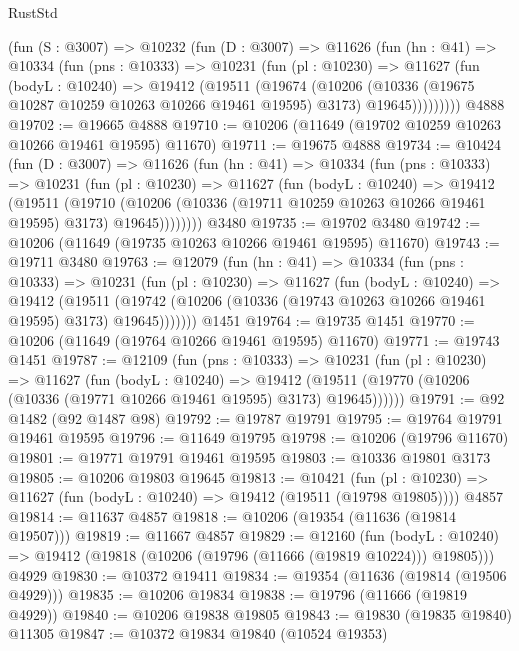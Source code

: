 \begin{lexlean}{RustStd}
\begin{coremodule}
    (fun (S : @3007) =>
    @10232
      (fun (D : @3007) =>
      @11626
        (fun (hn : @41) =>
        @10334
          (fun (pns : @10333) =>
          @10231
            (fun (pl : @10230) =>
            @11627
              (fun (bodyL : @10240) =>
              @19412
                (@19511
                  (@19674
                    (@10206
                      (@10336 (@19675 @10287 @10259 @10263 @10266 @19461 @19595) @3173)
                      @19645)))))))))
    @4888
@19702 := @19665 @4888
@19710 := @10206 (@11649 (@19702 @10259 @10263 @10266 @19461 @19595) @11670)
@19711 := @19675 @4888
@19734 := @10424
    (fun (D : @3007) =>
    @11626
      (fun (hn : @41) =>
      @10334
        (fun (pns : @10333) =>
        @10231
          (fun (pl : @10230) =>
          @11627
            (fun (bodyL : @10240) =>
            @19412
              (@19511
                (@19710
                  (@10206 (@10336 (@19711 @10259 @10263 @10266 @19461 @19595) @3173) @19645))))))))
    @3480
@19735 := @19702 @3480
@19742 := @10206 (@11649 (@19735 @10263 @10266 @19461 @19595) @11670)
@19743 := @19711 @3480
@19763 := @12079
    (fun (hn : @41) =>
    @10334
      (fun (pns : @10333) =>
      @10231
        (fun (pl : @10230) =>
        @11627
          (fun (bodyL : @10240) =>
          @19412
            (@19511
              (@19742 (@10206 (@10336 (@19743 @10263 @10266 @19461 @19595) @3173) @19645)))))))
    @1451
@19764 := @19735 @1451
@19770 := @10206 (@11649 (@19764 @10266 @19461 @19595) @11670)
@19771 := @19743 @1451
@19787 := @12109
    (fun (pns : @10333) =>
    @10231
      (fun (pl : @10230) =>
      @11627
        (fun (bodyL : @10240) =>
        @19412 (@19511 (@19770 (@10206 (@10336 (@19771 @10266 @19461 @19595) @3173) @19645))))))
@19791 := @92 @1482 (@92 @1487 @98)
@19792 := @19787 @19791
@19795 := @19764 @19791 @19461 @19595
@19796 := @11649 @19795
@19798 := @10206 (@19796 @11670)
@19801 := @19771 @19791 @19461 @19595
@19803 := @10336 @19801 @3173
@19805 := @10206 @19803 @19645
@19813 := @10421
    (fun (pl : @10230) => @11627 (fun (bodyL : @10240) => @19412 (@19511 (@19798 @19805))))
    @4857
@19814 := @11637 @4857
@19818 := @10206 (@19354 (@11636 (@19814 @19507)))
@19819 := @11667 @4857
@19829 := @12160
    (fun (bodyL : @10240) => @19412 (@19818 (@10206 (@19796 (@11666 (@19819 @10224))) @19805)))
    @4929
@19830 := @10372 @19411
@19834 := @19354 (@11636 (@19814 (@19506 @4929)))
@19835 := @10206 @19834
@19838 := @19796 (@11666 (@19819 @4929))
@19840 := @10206 @19838 @19805
@19843 := @19830 (@19835 @19840) @11305
@19847 := @10372 @19834 @19840 (@10524 @19353)

\end{coremodule}
\end{lexlean}
